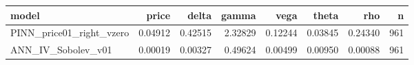 \begin{tabular}{lrrrrrrr}
\toprule
model & price & delta & gamma & vega & theta & rho & n \\
\midrule
PINN_price01_right_vzero & 0.04912 & 0.42515 & 2.32829 & 0.12244 & 0.03845 & 0.24340 & 961 \\
ANN_IV_Sobolev_v01 & 0.00019 & 0.00327 & 0.49624 & 0.00499 & 0.00950 & 0.00088 & 961 \\
\bottomrule
\end{tabular}
